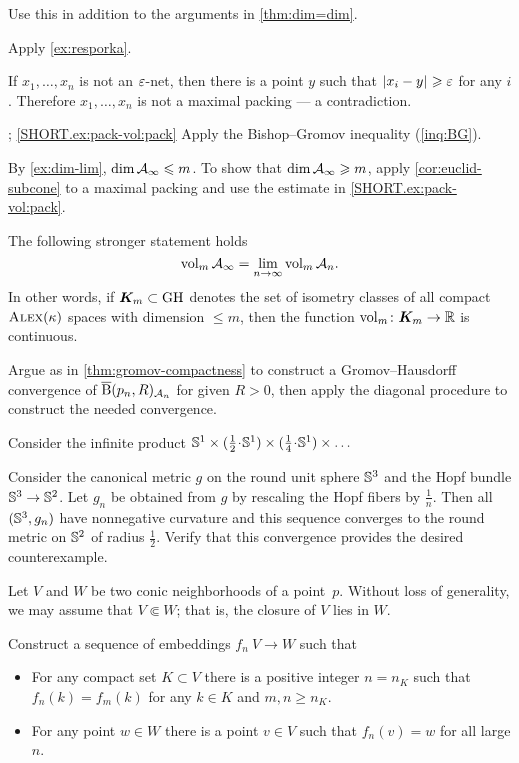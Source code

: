 Use this in addition to the arguments in \ref{thm:dim=dim}. 

Apply \ref{ex:resporka}.




 If $x_1,\dots,x_n$ is not an $\varepsilon$-net, then there is a point $y$ such that $|{x_i}-{y}|_{}^{{}}\geqslant\varepsilon$ for any $i$.
Therefore $x_1,\dots,x_n$ is not a maximal packing --- a contradiction.

\parbf{\ref{ex:pack-vol}}; \ref{SHORT.ex:pack-vol:pack}
Apply the Bishop--Gromov inequality (\ref{inq:BG}).

\parit{\ref{SHORT.ex:pack-vol:dim}}
By \ref{ex:dim-lim}, $\operatorname{\rm dim}\nolimits\mathcal{A}_\infty\leqslant m$.
To show that $\operatorname{\rm dim}\nolimits\mathcal{A}_\infty\geqslant m$,
apply \ref{cor:euclid-subcone} to a maximal packing and use the estimate in \ref{SHORT.ex:pack-vol:pack}.

The following stronger statement holds
\[\operatorname{\rm vol}\nolimits_m\mathcal{A}_\infty=\lim_{n\to\infty} \operatorname{\rm vol}\nolimits_m\mathcal{A}_n.\]
In other words, if $\bm{K}_m\subset \operatorname{\rm GH}\nolimits$ denotes the set of isometry classes of all compact $\textsc{Alex}(\kappa)$ spaces with dimension $\le m$, then the function
$\operatorname{\rm vol}\nolimits_m\colon\bm{K}_m\to \mathbb{R}$ is continuous.


Argue as in \ref{thm:gromov-compactness} to construct a Gromov--Hausdorff convergence of $\overline{\mathrm{B}}{}(p_n,R)_{\mathcal{A}_n}$ for given $R>0$, then apply the diagonal procedure to construct the needed convergence.

Consider the infinite product $\SSS^1\times ({\tfrac 12}\cdot \SSS^1)\times ({\tfrac 14}\cdot \SSS^1)\times\dots$

Consider the canonical metric $g$ on the round unit sphere $\mathbb{S}^3$ and the Hopf bundle $\mathbb{S}^3\to \mathbb{S}^2$.
Let $g_n$ be obtained from $g$ by rescaling the Hopf fibers by $\frac{1}{n}$.
Then all  $(\mathbb{S}^3,g_n)$ have nonnegative curvature and this sequence converges to the round metric on $\mathbb{S}^2$ of radius $\frac{1}{2}$.
Verify that this convergence provides the desired counterexample.



Let $V$ and $W$ be two conic neighborhoods of a point~$p$.
Without loss of generality, we may assume that $V\Subset W$;
that is, the closure of $V$ lies in $W$.

Construct a sequence of embeddings $f_n\:V\to W$
such that 
\begin{itemize}
\item 
For any compact set $K\subset V$ 
there is a positive integer $n=n_K$ such that 
$f_n(k)=f_m(k)$ for any $k\in K$ and $m, n \ge n_K$.
\item For any point $w\in W$ there is a point $v\in V$ such that $f_n(v)=w$ for all large $n$.
\end{itemize}

